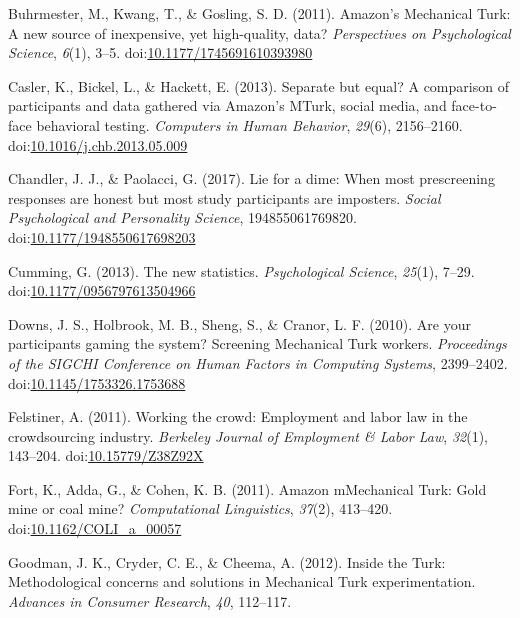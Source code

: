 \documentclass[english,man]{apa6}
\theoremstyle{definition}
\theoremstyle{definition}
\theoremstyle{definition}
\theoremstyle{remark}
\begin{document}
\hypertarget{ref-Buhrmester2011}{}
Buhrmester, M., Kwang, T., \& Gosling, S. D. (2011). Amazon's Mechanical
Turk: A new source of inexpensive, yet high-quality, data?
\emph{Perspectives on Psychological Science}, \emph{6}(1), 3--5.
doi:\href{https://doi.org/10.1177/1745691610393980}{10.1177/1745691610393980}

\hypertarget{ref-Casler2013}{}
Casler, K., Bickel, L., \& Hackett, E. (2013). Separate but equal? A
comparison of participants and data gathered via Amazon's MTurk, social
media, and face-to-face behavioral testing. \emph{Computers in Human
Behavior}, \emph{29}(6), 2156--2160.
doi:\href{https://doi.org/10.1016/j.chb.2013.05.009}{10.1016/j.chb.2013.05.009}

\hypertarget{ref-Chandler2017}{}
Chandler, J. J., \& Paolacci, G. (2017). Lie for a dime: When most
prescreening responses are honest but most study participants are
imposters. \emph{Social Psychological and Personality Science},
194855061769820.
doi:\href{https://doi.org/10.1177/1948550617698203}{10.1177/1948550617698203}

\hypertarget{ref-Cumming2013}{}
Cumming, G. (2013). The new statistics. \emph{Psychological Science},
\emph{25}(1), 7--29.
doi:\href{https://doi.org/10.1177/0956797613504966}{10.1177/0956797613504966}

\hypertarget{ref-Downs2010}{}
Downs, J. S., Holbrook, M. B., Sheng, S., \& Cranor, L. F. (2010). Are
your participants gaming the system? Screening Mechanical Turk workers.
\emph{Proceedings of the SIGCHI Conference on Human Factors in Computing
Systems}, 2399--2402.
doi:\href{https://doi.org/10.1145/1753326.1753688}{10.1145/1753326.1753688}

\hypertarget{ref-Felstiner2011}{}
Felstiner, A. (2011). Working the crowd: Employment and labor law in the
crowdsourcing industry. \emph{Berkeley Journal of Employment \& Labor
Law}, \emph{32}(1), 143--204.
doi:\href{https://doi.org/10.15779/Z38Z92X}{10.15779/Z38Z92X}

\hypertarget{ref-Fort2011}{}
Fort, K., Adda, G., \& Cohen, K. B. (2011). Amazon mMechanical Turk:
Gold mine or coal mine? \emph{Computational Linguistics}, \emph{37}(2),
413--420.
doi:\href{https://doi.org/10.1162/COLI_a_00057}{10.1162/COLI\_a\_00057}

\hypertarget{ref-Goodman2012}{}
Goodman, J. K., Cryder, C. E., \& Cheema, A. (2012). Inside the Turk:
Methodological concerns and solutions in Mechanical Turk
experimentation. \emph{Advances in Consumer Research}, \emph{40},
112--117.
\end{document}
